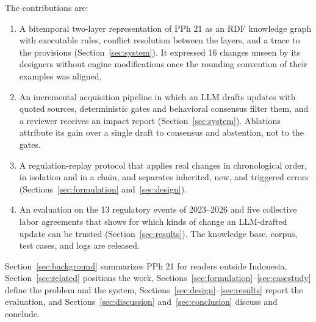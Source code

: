 The contributions are:
\begin{enumerate}
\item A bitemporal two-layer representation of PPh 21 as an RDF knowledge graph with executable rules, conflict resolution between the layers, and a trace to the provisions (Section~\ref{sec:system}). It expressed 16 changes unseen by its designers without engine modifications once the rounding convention of their examples was aligned.
\item An incremental acquisition pipeline in which an LLM drafts updates with quoted sources, deterministic gates and behavioral consensus filter them, and a reviewer receives an impact report (Section~\ref{sec:system}). Ablations attribute its gain over a single draft to consensus and abstention, not to the gates.
\item A regulation-replay protocol that applies real changes in chronological order, in isolation and in a chain, and separates inherited, new, and triggered errors (Sections~\ref{sec:formulation} and~\ref{sec:design}).
\item An evaluation on the 13 regulatory events of 2023--2026 and five collective labor agreements that shows for which kinds of change an LLM-drafted update can be trusted (Section~\ref{sec:results}). The knowledge base, corpus, test cases, and logs are released.
\end{enumerate}
Section~\ref{sec:background} summarizes PPh 21 for readers outside Indonesia, Section~\ref{sec:related} positions the work, Sections~\ref{sec:formulation}--\ref{sec:casestudy} define the problem and the system, Sections~\ref{sec:design}--\ref{sec:results} report the evaluation, and Sections~\ref{sec:discussion} and~\ref{sec:conclusion} discuss and conclude.

